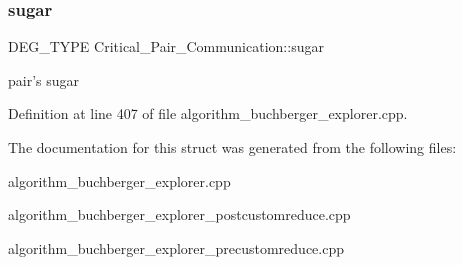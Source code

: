 \subsubsection{\texorpdfstring{sugar}{sugar}}
{\footnotesize\ttfamily D\+E\+G\+\_\+\+T\+Y\+PE Critical\+\_\+\+Pair\+\_\+\+Communication\+::sugar}



pair's sugar 



Definition at line 407 of file algorithm\+\_\+buchberger\+\_\+explorer.\+cpp.



The documentation for this struct was generated from the following files\+:\begin{DoxyCompactItemize}
\item 
algorithm\+\_\+buchberger\+\_\+explorer.\+cpp\item 
algorithm\+\_\+buchberger\+\_\+explorer\+\_\+postcustomreduce.\+cpp\item 
algorithm\+\_\+buchberger\+\_\+explorer\+\_\+precustomreduce.\+cpp\end{DoxyCompactItemize}
